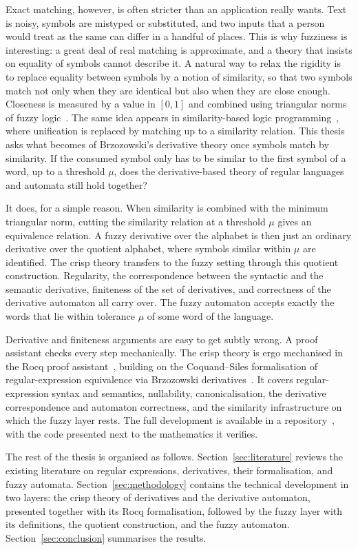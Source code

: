 Exact matching, however, is often stricter than an application really wants. Text is
noisy, symbols are mistyped or substituted, and two inputs that a person would treat
as the same can differ in a handful of places. This is why fuzziness is interesting:
a great deal of real matching is approximate, and a theory that insists on equality
of symbols cannot describe it. A natural way to relax the rigidity is to replace
equality between symbols by a notion of similarity, so that two symbols match
not only when they are identical but also when they are close enough. Closeness is
measured by a value in $[0,1]$ and combined using triangular norms 
of fuzzy logic~\cite{met05}. The same idea appears in similarity-based logic
programming~\cite{Sessa2002}, where unification is replaced by matching up to a
similarity relation. This thesis asks what becomes of Brzozowski's derivative 
theory once symbols match by similarity. If the consumed symbol only has to be 
similar to the first symbol of a word, up to a threshold $\mu$, does the
derivative-based theory of regular languages and automata still hold together?

It does, for a simple reason.
When similarity is combined with the minimum triangular norm, cutting the similarity
relation at a threshold $\mu$ gives an equivalence relation. A fuzzy derivative over
the alphabet is then just an ordinary derivative over the quotient alphabet, where
symbols similar within $\mu$ are identified. The crisp theory transfers to the fuzzy
setting through this quotient construction. Regularity, the correspondence between
the syntactic and the semantic derivative, finiteness of the set of derivatives, and
correctness of the derivative automaton all carry over. The fuzzy automaton accepts
exactly the words that lie within tolerance $\mu$ of some word of the language.

Derivative and finiteness arguments are easy to get subtly wrong. A proof assistant
checks every step mechanically. The crisp theory is ergo mechanised in the Rocq proof
assistant~\cite{Rocq}, building on the Coquand--Siles formalisation of
regular-expression equivalence via Brzozowski
derivatives~\cite{CoquandRegexEquality,RocqRegexpBrzozowski}. It covers
regular-expression syntax and semantics, nullability, canonicalisation, the
derivative correspondence and automaton correctness, and the similarity
infrastructure on which the fuzzy layer rests. The full development is available in
a repository~\cite{OurRocqRepo}, with the code presented next to the
mathematics it verifies.

The rest of the thesis is organised as follows. Section~\ref{sec:literature} reviews
the existing literature on regular expressions, derivatives, their formalisation, and
fuzzy automata.
Section~\ref{sec:methodology} contains the technical development in two layers: the
crisp theory of derivatives and the derivative automaton, presented together with
its Rocq formalisation, followed by the fuzzy layer with its definitions, the
quotient construction, and the fuzzy automaton. Section~\ref{sec:conclusion}
summarises the results.
